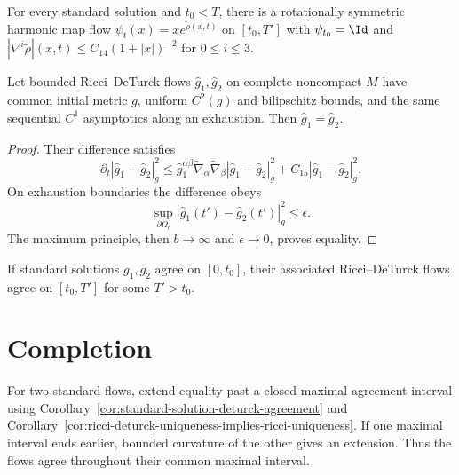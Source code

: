 \begin{proposition}
\label{prop:harmonic-map-flow-existence-decay}
\label{harmapflow}
For every standard solution and $t_0<T$, there is a rotationally symmetric
harmonic map flow $\psi_t(x)=xe^{\tilde\rho(x,t)}$ on $[t_0,T']$ with
$\psi_{t_0}=\Id$ and $|\nabla^i\tilde\rho|(x,t)\le C_{14}(1+|x|)^{-2}$
for $0\le i\le3$.
\end{proposition}

\begin{proposition}
\label{prop:ricci-deturck-uniqueness-noncompact}
\label{RDuniq}
Let bounded Ricci--DeTurck flows $\hat g_1,\hat g_2$ on complete noncompact
$M$ have common initial metric $g$, uniform $C^2(g)$ and bilipschitz bounds,
and the same sequential $C^1$ asymptotics along an exhaustion. Then
$\hat g_1=\hat g_2$.
\end{proposition}
\begin{proof}
\sketch Their difference satisfies
\begin{equation}\label{eqestforunique}
 \partial_t|\hat g_1-\hat g_2|_g^2\le\hat g_1^{\alpha\beta}\tilde\nabla_\alpha\tilde\nabla_\beta|\hat g_1-\hat g_2|_g^2+C_{15}|\hat g_1-\hat g_2|_g^2.
\end{equation}
On exhaustion boundaries the difference obeys
\begin{equation}\label{eq est for uniq
bddy}
\sup_{\partial\Omega_b}|\hat g_1(t')-\hat g_2(t')|_g^2\le\epsilon.
\end{equation}
The maximum principle, then $b\to\infty$ and $\epsilon\to0$, proves equality.
\end{proof}

\begin{corollary}
\label{cor:standard-solution-deturck-agreement}
\label{duniq}
If standard solutions $g_1,g_2$ agree on $[0,t_0]$, their associated
Ricci--DeTurck flows agree on $[t_0,T']$ for some $T'>t_0$.
\end{corollary}

\section{Completion}
For two standard flows, extend equality past a closed maximal agreement
interval using Corollary~\ref{cor:standard-solution-deturck-agreement} and
Corollary~\ref{cor:ricci-deturck-uniqueness-implies-ricci-uniqueness}. If one
maximal interval ends earlier, bounded curvature of the other gives an
extension. Thus the flows agree throughout their common maximal interval.

